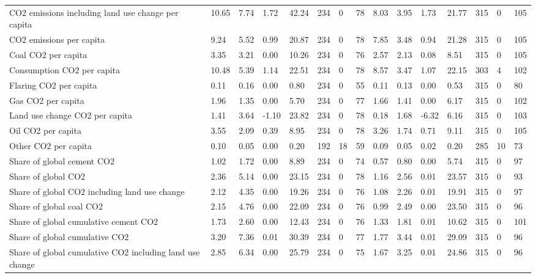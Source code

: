 \begin{longtable}{lllllllllllllll}
CO2 emissions including land use change per capita & 10.65 & 7.74 & 1.72 & 42.24 & 234 & 0 & 78 & 8.03 & 3.95 & 1.73 & 21.77 & 315 & 0 & 105\\
CO2 emissions per capita & 9.24 & 5.52 & 0.99 & 20.87 & 234 & 0 & 78 & 7.85 & 3.48 & 0.94 & 21.28 & 315 & 0 & 105\\
Coal CO2 per capita & 3.35 & 3.21 & 0.00 & 10.26 & 234 & 0 & 76 & 2.57 & 2.13 & 0.08 & 8.51 & 315 & 0 & 105\\
\addlinespace
Consumption CO2 per capita & 10.48 & 5.39 & 1.14 & 22.51 & 234 & 0 & 78 & 8.57 & 3.47 & 1.07 & 22.15 & 303 & 4 & 102\\
Flaring CO2 per capita & 0.11 & 0.16 & 0.00 & 0.80 & 234 & 0 & 55 & 0.11 & 0.13 & 0.00 & 0.53 & 315 & 0 & 80\\
Gas CO2 per capita & 1.96 & 1.35 & 0.00 & 5.70 & 234 & 0 & 77 & 1.66 & 1.41 & 0.00 & 6.17 & 315 & 0 & 102\\
Land use change CO2 per capita & 1.41 & 3.64 & -1.10 & 23.82 & 234 & 0 & 78 & 0.18 & 1.68 & -6.32 & 6.16 & 315 & 0 & 103\\
Oil CO2 per capita & 3.55 & 2.09 & 0.39 & 8.95 & 234 & 0 & 78 & 3.26 & 1.74 & 0.71 & 9.11 & 315 & 0 & 105\\
\addlinespace
Other CO2 per capita & 0.10 & 0.05 & 0.00 & 0.20 & 192 & 18 & 59 & 0.09 & 0.05 & 0.02 & 0.20 & 285 & 10 & 73\\
Share of global cement CO2 & 1.02 & 1.72 & 0.00 & 8.89 & 234 & 0 & 74 & 0.57 & 0.80 & 0.00 & 5.74 & 315 & 0 & 97\\
Share of global CO2 & 2.36 & 5.14 & 0.00 & 23.15 & 234 & 0 & 78 & 1.16 & 2.56 & 0.01 & 23.57 & 315 & 0 & 93\\
Share of global CO2 including land use change & 2.12 & 4.35 & 0.00 & 19.26 & 234 & 0 & 76 & 1.08 & 2.26 & 0.01 & 19.91 & 315 & 0 & 97\\
Share of global coal CO2 & 2.15 & 4.76 & 0.00 & 22.09 & 234 & 0 & 76 & 0.99 & 2.49 & 0.00 & 23.50 & 315 & 0 & 96\\
\addlinespace
Share of global cumulative cement CO2 & 1.73 & 2.60 & 0.00 & 12.43 & 234 & 0 & 76 & 1.33 & 1.81 & 0.01 & 10.62 & 315 & 0 & 101\\
Share of global cumulative CO2 & 3.20 & 7.36 & 0.01 & 30.39 & 234 & 0 & 77 & 1.77 & 3.44 & 0.01 & 29.09 & 315 & 0 & 96\\
Share of global cumulative CO2 including land use change & 2.85 & 6.34 & 0.00 & 25.79 & 234 & 0 & 75 & 1.67 & 3.25 & 0.01 & 24.86 & 315 & 0 & 96\\

\end{longtable}

